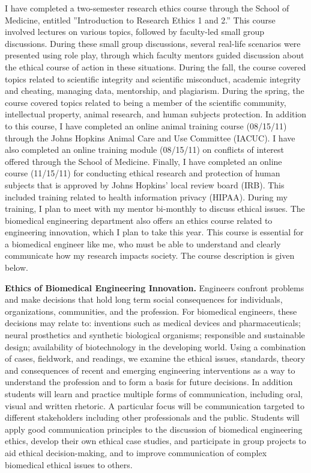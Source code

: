 \documentclass[11pt,notitlepage]{article}
\begin{document}
I have completed a two-semester research ethics course through the School of Medicine, entitled ''Introduction to Research Ethics 1 and 2.'' This course involved lectures on various topics, followed by faculty-led small group discussions. During these small group discussions, several real-life scenarios were presented using role play, through which faculty mentors guided discussion about the ethical course of action in these situations. During the fall, the course covered topics related to scientific integrity and scientific misconduct, academic integrity and cheating, managing data, mentorship, and plagiarism. During the spring, the course covered topics related to being a member of the scientific community, intellectual property, animal research, and human subjects protection. In addition to this course, I have completed an online animal training course (08/15/11) through the Johns Hopkins Animal Care and Use Committee (IACUC). I have also completed an online training module (08/15/11) on conflicts of interest offered through the School of Medicine. Finally, I have completed an online course (11/15/11) for conducting ethical research and protection of human subjects that is approved by Johns Hopkins' local review board (IRB). This included training related to health information privacy (HIPAA). During my training, I plan to meet with my mentor bi-monthly to discuss ethical issues. The biomedical engineering department also offers an ethics course related to engineering innovation, which I plan to take this year. This course is essential for a biomedical engineer like me, who must be able to understand and clearly communicate how my research impacts society. The course description is given below.

\textbf{Ethics of Biomedical Engineering Innovation.} Engineers confront problems and make decisions that hold long term social consequences for individuals, organizations, communities, and the profession. For biomedical engineers, these decisions may relate to: inventions such as medical devices and pharmaceuticals; neural prosthetics and synthetic biological organisms; responsible and sustainable design; availability of biotechnology in the developing world. Using a combination of cases, fieldwork, and readings, we examine the ethical issues, standards, theory and consequences of recent and emerging engineering interventions as a way to understand the profession and to form a basis for future decisions. In addition students will learn and practice multiple forms of communication, including oral, visual and written rhetoric.  A particular focus will be communication targeted to different stakeholders including other professionals and the public. Students will apply good communication principles to the discussion of biomedical engineering ethics, develop their own ethical case studies, and participate in group projects to aid ethical decision-making, and to improve communication of complex biomedical ethical issues to others.
\end{document}
